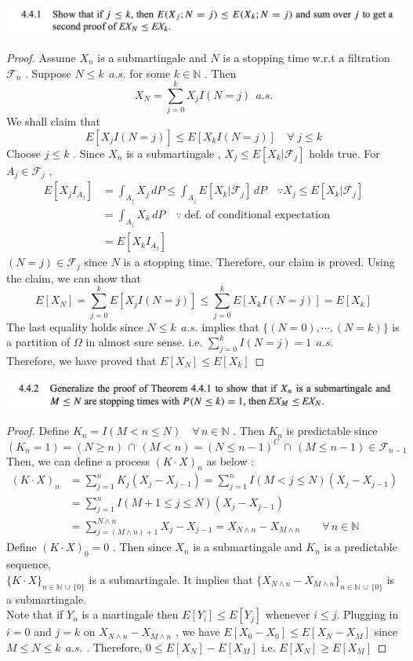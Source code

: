 \documentclass[12pt, A4]{article}
\newcommand{\N}{\mathbb{N}}
\newcommand{\F}{\mathcal{F}}
\newcommand{\union}{\,\cup\,}
\newcommand{\intersect}{\,\cap\,}
\newcommand{\foranyn}{\quad \forall \, n\in \N}
\begin{document}
\includegraphics[width=17cm]{Exer4.4.1.png}
\begin{proof}
    Assume $X_n$ is a submartingale and $N$ is a stopping time w.r.t a filtration $\F_n$ . Suppose $N\leq k\;\,a.s.$ for some $k\in \N$ . Then $$ X_N=\sum_{j=0}^k X_j I(N=j)\;\,a.s.$$
    We shall claim that $$ E[X_j I(N=j)]\leq E[X_k I(N=j)]\quad \forall\; j\leq k$$
    Choose $j\leq k$ . Since $X_n$ is a submartingale , $X_j\leq E[X_k |\F_j]$ holds true. For $A_j\in \F_j$ ,
    \begin{align*}
        E[X_jI_{A_j}]&= \int_{A_j}X_j \, dP \leq \int_{A_j} E[X_k|\F_j]\,dP \quad \because X_j\leq E[X_k |\F_j] \\
        &= \int_{A_j} X_k \, dP \quad \because \; \text{def. of conditional expectation}\\ &= E[X_k I_{A_j}]
    \end{align*}
    $(N=j)\in \F_j$ since $N$ is a stopping time. Therefore, our claim is proved. Using the claim, we can show that $$ E[X_N]=\sum_{j=0}^k E[X_jI(N=j)]\leq \sum_{j=0}^k E[X_kI(N=j)]=E[X_k] $$ The last equality holds since $N\leq k\;\,a.s.$ implies that $\{(N=0), \cdots , (N=k)\}$ is a partition of $\Omega$ in almost sure sense. \; i.e. $\sum_{j=0}^k I(N=j)=1 \;\,a.s.$ \\ Therefore, we have proved that $E[X_N]\leq E[X_k]$
\end{proof}
\clearpage

\includegraphics[width=17cm]{Exer4.4.2.png}
\begin{proof}
    Define $K_n=I(M<n\leq N)\foranyn$ . Then $K_n$ is predictable since $$(K_n=1)=(N\geq n)\intersect (M<n)=(N\leq n-1)^C\intersect (M\leq n-1)\in \F_{n-1} $$
    Then, we can define a process $(K\cdot X)_n$ as below :
    \begin{align*}
        (K\cdot X)_n &= \sum_{j=1}^n K_j(X_j-X_{j-1})=\sum_{j=1}^n I(M<j\leq N)(X_j-X_{j-1}) \\ &=\sum_{j=1}^n I(M+1\leq j\leq N)(X_j-X_{j-1}) \\ 
        &= \sum_{j=(M\wedge n)+1}^{N\wedge n} X_j - X_{j-1} = X_{N\wedge n} - X_{M\wedge n} \quad \foranyn
    \end{align*}
    Define $(K\cdot X)_0=0$ . Then since $X_n$ is a submartingale and $K_n$ is a predictable sequence, \\$\{K\cdot X\}_{n\in \N\union \{0\}}$ is a submartingale. It implies that $\{X_{N\wedge n}-X_{M\wedge n}\}_{n\in \N\union\{0\}}$ is a submartingale. \\ Note that if $Y_n$ is a martingale then $E[Y_i]\leq E[Y_j]$ whenever $i\leq j$. Plugging in $i=0$ and $j=k$ on $X_{N\wedge n}-X_{M\wedge n}$ , we have $E[X_0-X_0]\leq E[X_N-X_M]$ since $M\leq N\leq k\;\,a.s.$ . Therefore, $0\leq E[X_N]-E[X_M]$ \;i.e.\; $E[X_N]\geq E[X_M]$
\end{proof}
\vspace{1cm}
\end{document}
